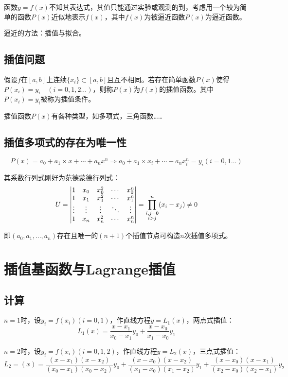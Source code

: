 \documentclass[UTF8,a4paper,11pt,oneside]{ctexbook}
\begin{document}
函数\(y=f(x)\)不知其表达式，其值只能通过实验或观测的到，考虑用一个较为简单的函数\(P(x)\)近似地表示\(f(x)\)，其中\(f(x)\)为被逼近函数\(P(x)\)为逼近函数。

逼近的方法：插值与拟合。

\subsection{插值问题}

假设\(f\)在\([a,b]\)上连续\(\{x_i\}\subset[a,b]\)且互不相同。若存在简单函数\(P(x)\)使得\(P(x_i)=y_i\quad(i=0,1,2\dots)\)，则称\(P(x)\)为\(f(x)\)的插值函数。其中\(P(x_i)=y_i\)被称为插值条件。

插值函数\(P(x)\)有各种类型，如多项式，三角函数……

\subsection{插值多项式的存在为唯一性}
\[
P(x)=a_0+a_1\times x+\cdots+a_nx^n\Rightarrow a_0+a_1\times x_i+\cdots+a_nx_i^n=y_i(i=0,1\dots)
\]

其系数行列式刚好为范德蒙德行列式：
\[U=\begin{vmatrix}
    1&x_0&x_0^2&\cdots&x_0^n\\
    1&x_1&x_1^2&\cdots&x_1^n\\
    \vdots&\vdots&\vdots&\ddots&\vdots\\
    1&x_n&x_n^2&\cdots&x_n^n
\end{vmatrix}=\prod_{\begin{subarray}{c}
    i,j=0\\
    i>j
\end{subarray}}^n(x_i-x_j)\neq0\]

即\((a_0,a_1,\ldots,a_n)\)存在且唯一的\((n+1)\)个插值节点可构造\(n\)次插值多项式。

\section{插值基函数与Lagrange插值}

\subsection{计算}

\(n=1\)时，设\(y_i=f(x_i)(i=0,1)\)，作直线方程\(y=L_1(x)\)，两点式插值：
\[
L_1(x)=\frac{x-x_1}{x_0-x_1}y_0+\frac{x-x_0}{x_1-x_0}y_1
\]

\(n=2\)时，设\(y_i=f(x_i)(i=0,1,2)\)，作直线方程\(y=L_2(x)\)，三点式插值：
\[
L_2=(x)=\frac{(x-x_1)(x-x_2)}{(x_0-x_1)(x_0-x_2)}y_0+\frac{(x-x_0)(x-x_2)}{(x_1-x_0)(x_1-x_2)}y_1+\frac{(x-x_0)(x-x_1)}{(x_2-x_0)(x_2-x_1)}y_2
\]
\end{document}
